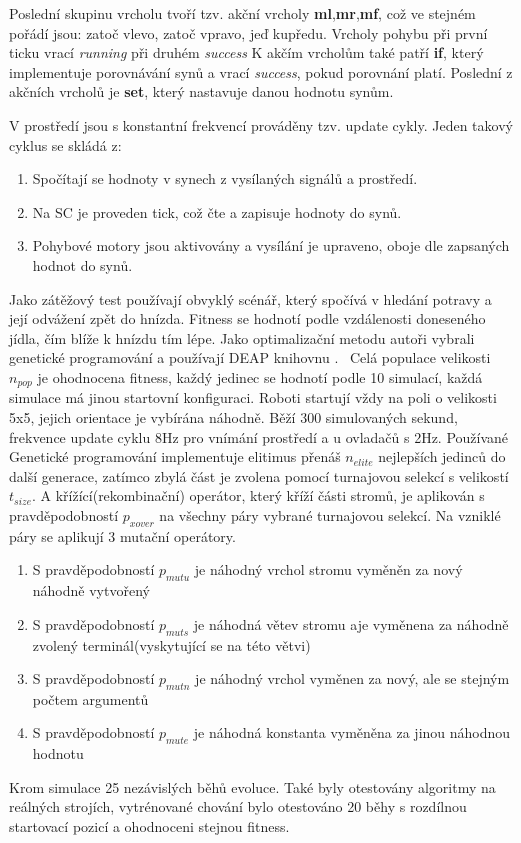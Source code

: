 Poslední skupinu vrcholu tvoří tzv. akční vrcholy \textbf{ml},\textbf{mr},\textbf{mf}, což ve stejném pořádí jsou: zatoč vlevo, zatoč vpravo, jeď kupředu. Vrcholy pohybu při první ticku vrací \textit{running} při druhém \textit{success} K akčím vrcholům také patří \textbf{if}, který implementuje porovnávání synů a vrací \textit{success}, pokud porovnání platí. Poslední z akčních vrcholů je \textbf{set}, který nastavuje danou hodnotu synům. 
\par
V prostředí jsou s konstantní frekvencí prováděny tzv. update cykly. Jeden takový cyklus se skládá z: 
\par
\begin{enumerate}
    \item Spočítají se hodnoty v synech z vysílaných signálů a prostředí. 
    \item Na SC je proveden tick, což čte a zapisuje hodnoty do synů. 
    \item Pohybové motory jsou aktivovány a vysílání je upraveno, oboje dle zapsaných hodnot do synů.
\end{enumerate}
\par 
Jako zátěžový test používají obvyklý scénář, který spočívá v hledání potravy a její odvážení zpět do hnízda. Fitness se hodnotí podle vzdálenosti doneseného jídla, čím blíže k hnízdu tím lépe. Jako optimalizační metodu autoři vybrali genetické programování a používají DEAP knihovnu \cite{deap}. \
Celá populace velikosti $n_{pop}$ je ohodnocena fitness, každý jedinec se hodnotí podle 10 simulací, každá simulace má jinou startovní konfiguraci. Roboti startují vždy na poli o velikosti 5x5, jejich orientace je vybírána náhodně. Běží 300 simulovaných sekund, frekvence update cyklu 8Hz pro vnímání prostředí a u ovladačů s 2Hz. Používané Genetické programování implementuje elitimus přenáš $n_{elite}$ nejlepších jedinců do další generace, zatímco zbylá část je zvolena pomocí turnajovou selekcí s velikostí $t_{size}$. A křížící(rekombinační) operátor, který kříží části stromů, je aplikován s pravděpodobností $p_{xover}$ na všechny páry vybrané turnajovou selekcí. Na vzniklé páry se aplikují 3 mutační operátory. \par
\begin{enumerate}
    \item S pravděpodobností $p_{mutu}$ je náhodný vrchol stromu vyměněn za nový náhodně vytvořený 
    \item S pravděpodobností $p_{muts}$ je náhodná větev stromu aje  vyměnena za náhodně zvolený terminál(vyskytující se na této větvi)
    \item S pravděpodobností $p_{mutn}$ je náhodný vrchol vyměnen za nový, ale se stejným počtem argumentů
    \item S pravděpodobností $p_{mute}$ je náhodná konstanta vyměněna za jinou náhodnou hodnotu
\end{enumerate}
Krom simulace 25 nezávislých běhů evoluce. Také byly otestovány algoritmy na reálných strojích, vytrénované chování bylo otestováno 20 běhy s rozdílnou startovací pozicí a ohodnoceni stejnou fitness. 
\par 


